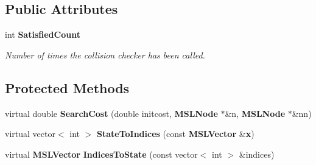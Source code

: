 \subsection*{Public Attributes}
\begin{CompactItemize}
\item 
int {\bf Satisfied\-Count}
\begin{CompactList}\small\item\em Number of times the collision checker has been called.\item\end{CompactList}\end{CompactItemize}
\subsection*{Protected Methods}
\begin{CompactItemize}
\item 
virtual double {\bf Search\-Cost} (double initcost, {\bf MSLNode} $\ast$\&n, {\bf MSLNode} $\ast$\&nn)
\item 
virtual vector$<$ int $>$ {\bf State\-To\-Indices} (const {\bf MSLVector} \&{\bf x})
\item 
virtual {\bf MSLVector} {\bf Indices\-To\-State} (const vector$<$ int $>$ \&indices)
\end{CompactItemize}
